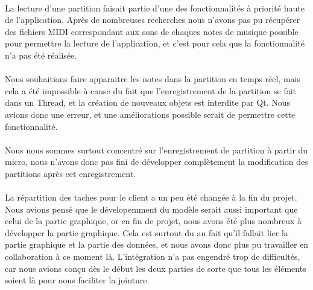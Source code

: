 \paragraph{}
La lecture d'une partition faisait partie d'une des fonctionnalités à priorité haute de l'application. Après 
de nombreuses recherches nous n'avons pas pu récupérer des fichiers MIDI correspondant aux sons de chaques 
notes de musique possible pour permettre la lecture de l'application, et c'est pour cela que la fonctionnalité 
n'a pas été réalisée.

\paragraph{}
Nous souhaitions faire apparaitre les notes dans la partition en temps réel, mais cela a été impossible à cause 
du fait que l'enregistrement de la partition se fait dans un Thread, et la création de nouveaux objets est 
interdite par Qt. Nous avions donc une erreur, et une améliorations possible serait de permettre cette fonctionnalité.

\paragraph{}
Nous nous sommes surtout concentré sur l'enregistrement de partition à partir du micro, nous n'avons donc pas fini 
de développer complètement la modification des partitions après cet enregistrement.

\paragraph{}


\paragraph{}
La répartition des taches pour le client a un peu été changée à la fin du projet. Nous avions pensé que le dévelopemment 
du modèle serait aussi important que celui de la partie graphique, or en fin de projet, nous avons été plus nombreux à 
développer la partie graphique. Cela est surtout du au fait qu'il fallait lier la partie graphique et la partie des données, 
et nous avons donc plus pu travailler en collaboration à ce moment là. L'intégration n'a pas engendré trop de difficultés, car 
nous avions conçu dès le début les deux parties de sorte que tous les éléments soient là pour nous faciliter la jointure.